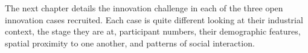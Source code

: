 The next chapter details the innovation challenge in each of the three open innovation cases recruited. Each case is quite different looking at their industrial context, the stage they are at, participant numbers, their demographic features, spatial proximity to one another, and patterns of social interaction. 